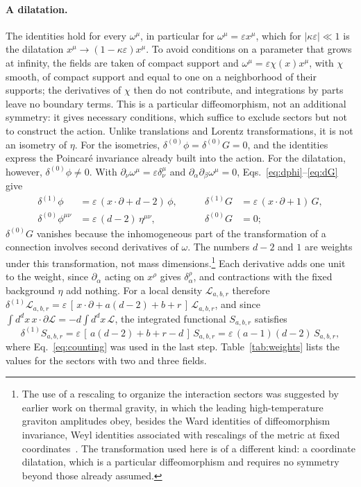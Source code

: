 \documentclass[prd,aps,preprint,nofootinbib,amsmath,amssymb,eqsecnum]{revtex4-2}
\begin{document}
\paragraph{A dilatation.} The identities hold for every $\omega^\mu$, in particular for
$\omega^\mu=\varepsilon x^\mu$, which for $|\kappa\varepsilon|\ll1$ is the dilatation
$x^\mu\to(1-\kappa\varepsilon)x^\mu$. To avoid conditions on a parameter that grows at
infinity, the fields are taken of compact support and $\omega^\mu=\varepsilon\chi(x)x^\mu$,
with $\chi$ smooth, of compact support and equal to one on a neighborhood of their supports;
the derivatives of $\chi$ then do not contribute, and integrations by parts leave no boundary
terms. This is a particular
diffeomorphism, not an additional symmetry: it gives necessary conditions, which suffice to
exclude sectors but not to construct the action. Unlike translations and Lorentz transformations,
it is not an isometry of $\eta$. For the isometries,
$\delta^{(0)}\phi=\delta^{(0)}G=0$, and the identities express the Poincar\'e invariance
already built into the action. For the dilatation, however, $\delta^{(0)}\phi\neq0$. With $\partial_\nu\omega^\mu=\varepsilon
\delta^\mu_\nu$ and $\partial_\alpha\partial_\beta\omega^\mu=0$,
Eqs.~\eqref{eq:dphi}--\eqref{eq:dG} give
\begin{equation}
\begin{aligned}
\delta^{(1)}\phi&=\varepsilon\,(x\cdot\partial+d-2)\,\phi,&\qquad
\delta^{(1)}G&=\varepsilon\,(x\cdot\partial+1)\,G,\\
\delta^{(0)}\phi^{\mu\nu}&=\varepsilon\,(d-2)\,\eta^{\mu\nu},&\qquad
\delta^{(0)}G&=0 ;
\end{aligned}
\label{eq:dilat}
\end{equation}
$\delta^{(0)}G$ vanishes because the inhomogeneous part of the transformation of a
connection involves second derivatives of $\omega$. The numbers $d-2$ and $1$ are weights
under this transformation, not mass dimensions.\footnote{The use of a rescaling to organize
the interaction sectors was suggested by earlier work on thermal gravity, in which the leading
high-temperature graviton amplitudes obey, besides the Ward identities of diffeomorphism
invariance, Weyl identities associated with rescalings of the metric at fixed
coordinates~\cite{BrandtFrenkel1993}. The transformation used here is of a different kind: a
coordinate dilatation, which is a particular diffeomorphism and requires no symmetry beyond
those already assumed.} Each derivative adds one unit to the weight,
since $\partial_\alpha$ acting on $x^\rho$ gives $\delta^\rho_\alpha$, and contractions with
the fixed background $\eta$ add nothing. For a local density $\mathcal L_{a,b,r}$ therefore
$\delta^{(1)}\mathcal L_{a,b,r}=\varepsilon\,[\,x\cdot\partial+a(d-2)+b+r\,]\,\mathcal L_{a,b,r}$,
and since $\int d^dx\,x\cdot\partial\mathcal L=-d\int d^dx\,\mathcal L$, the integrated
functional $S_{a,b,r}$ satisfies
\begin{equation}
\delta^{(1)}S_{a,b,r}=\varepsilon\,[\,a(d-2)+b+r-d\,]\,S_{a,b,r}
=\varepsilon\,(a-1)(d-2)\,S_{a,b,r},
\label{eq:weight}
\end{equation}
where Eq.~\eqref{eq:counting} was used in the last step. Table~\ref{tab:weights} lists the
values for the sectors with two and three fields.
\end{document}
